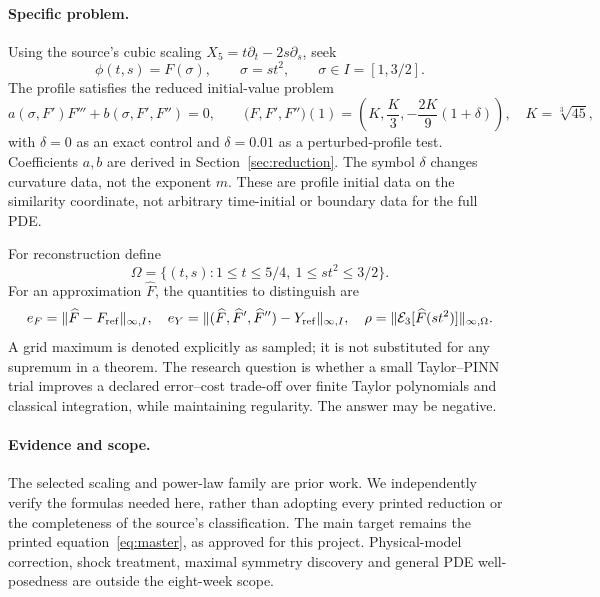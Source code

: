 \documentclass[11pt,a4paper]{article}
\theoremstyle{definition}
\theoremstyle{remark}
\newcommand{\E}{\mathcal E}
\begin{document}
\paragraph{Specific problem.}
Using the source's cubic scaling $X_5=t\partial_t-2s\partial_s$, seek
\begin{equation}
\phi(t,s)=F(\sigma),\qquad \sigma=st^2,\qquad
\sigma\in I=[1,3/2].
\label{eq:ansatz}
\end{equation}
The profile satisfies the reduced initial-value problem
\begin{equation}
a(\sigma,F')F'''+b(\sigma,F',F'')=0,\qquad
\bigl(F,F',F''\bigr)(1)=
\left(K,\frac K3,-\frac{2K}{9}(1+\delta)\right),
\quad K=\sqrt[3]{45},
\label{eq:ivp}
\end{equation}
with $\delta=0$ as an exact control and $\delta=0.01$ as a perturbed-profile test. Coefficients $a,b$ are derived in Section~\ref{sec:reduction}. The symbol $\delta$ changes curvature data, not the exponent $m$. These are profile initial data on the similarity coordinate, not arbitrary time-initial or boundary data for the full PDE.

For reconstruction define
\begin{equation}
\Omega=\{(t,s):1\le t\le5/4,\ 1\le st^2\le3/2\}.
\label{eq:domain}
\end{equation}
For an approximation $\widehat F$, the quantities to distinguish are
\begin{equation}
e_F=\|\widehat F-F_{\rm ref}\|_{\infty,I},\quad
e_Y=\|(\widehat F,\widehat F',\widehat F'')-Y_{\rm ref}\|_{\infty,I},
\quad
\rho=\|\E_3[\widehat F(st^2)]\|_{\infty,\Omega}.
\label{eq:metrics}
\end{equation}
A grid maximum is denoted explicitly as sampled; it is not substituted for any supremum in a theorem. The research question is whether a small Taylor--PINN trial improves a declared error--cost trade-off over finite Taylor polynomials and classical integration, while maintaining regularity. The answer may be negative.

\paragraph{Evidence and scope.}
The selected scaling and power-law family are prior work. We independently verify the formulas needed here, rather than adopting every printed reduction or the completeness of the source's classification. The main target remains the printed equation~\eqref{eq:master}, as approved for this project. Physical-model correction, shock treatment, maximal symmetry discovery and general PDE well-posedness are outside the eight-week scope.
\end{document}
